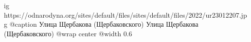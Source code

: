  
 
 
 
 

\ifcmt
  ig https://odnarodyna.org/sites/default/files/sites/default/files/2022/ur23012207.jpg
	@caption Улица Щербакова (Щербаковского) Улица Щербакова (Щербаковского)
	@wrap center
	@width 0.6
\fi
